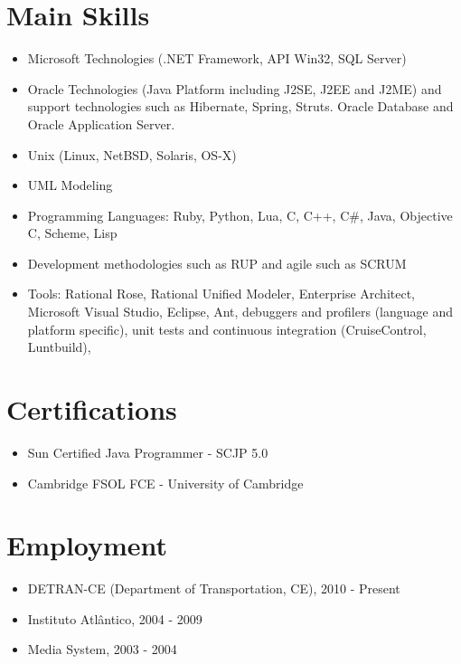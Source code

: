 \documentclass[letterpaper]{article}
\begin{document}
\section*{Main Skills}
\begin{itemize}
  \item Microsoft Technologies (.NET Framework, API Win32, SQL Server)
  \item Oracle Technologies (Java Platform including J2SE, J2EE and J2ME) and support
    technologies such as Hibernate, Spring, Struts.
    Oracle Database and Oracle Application Server.
  \item Unix (Linux, NetBSD, Solaris, OS-X)
  \item UML Modeling
  \item Programming Languages: Ruby, Python, Lua, C, C++, C\#, Java, Objective C, Scheme, Lisp
  \item Development methodologies such as RUP and agile such as SCRUM
  \item Tools: Rational Rose, Rational Unified Modeler, Enterprise Architect, Microsoft
Visual Studio, Eclipse, Ant, debuggers and profilers (language and platform
specific), unit tests and continuous integration (CruiseControl, Luntbuild),
\end{itemize}

\section*{Certifications}
\begin{itemize}
  \item Sun Certified Java Programmer - SCJP 5.0
  \item Cambridge FSOL FCE - University of Cambridge
\end{itemize}

\section*{Employment}

\begin{itemize}
\item DETRAN-CE (Department of Transportation, CE), 2010 - Present
\item Instituto Atlântico, 2004 - 2009
\item Media System, 2003 - 2004
\end{itemize}
\end{document}
